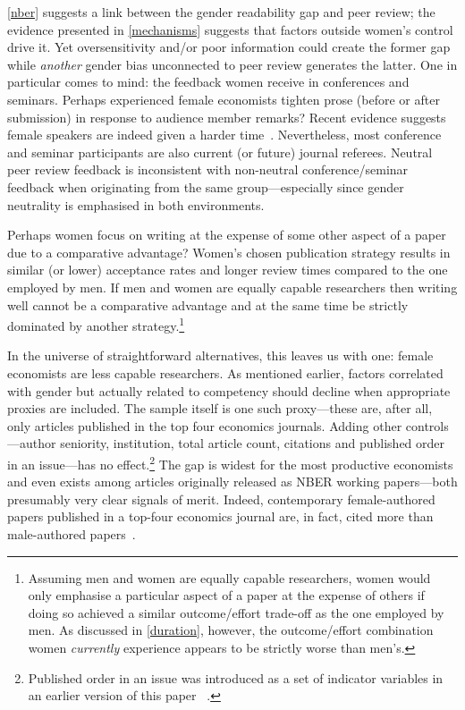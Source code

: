 \begin{appendices}
\begin{refsection}
\autoref{nber} suggests a link between the gender readability gap and peer review; the evidence presented in \autoref{mechanisms} suggests that factors outside women's control drive it. Yet oversensitivity and\slash or poor information could create the former gap while \emph{another} gender bias unconnected to peer review generates the latter. One in particular comes to mind: the feedback women receive in conferences and seminars. Perhaps experienced female economists tighten prose (before or after submission) in response to audience member remarks? Recent evidence suggests female speakers are indeed given a harder time~\citep{Dupas2021}. Nevertheless, most conference and seminar participants are also current (or future) journal referees. Neutral peer review feedback is inconsistent with non-neutral conference\slash seminar feedback when originating from the same group---especially since gender neutrality is emphasised in both environments.

Perhaps women focus on writing at the expense of some other aspect of a paper due to a comparative advantage? Women's chosen publication strategy results in similar (or lower) acceptance rates and longer review times compared to the one employed by men. If men and women are equally capable researchers then writing well cannot be a comparative advantage and at the same time be strictly dominated by another strategy.\footnote{Assuming men and women are equally capable researchers, women would only emphasise a particular aspect of a paper at the expense of others if doing so achieved a similar outcome\slash effort trade-off as the one employed by men. As discussed in \autoref{duration}, however, the outcome\slash effort combination women \emph{currently} experience appears to be strictly worse than men's.}

In the universe of straightforward alternatives, this leaves us with one: female economists are less capable researchers. As mentioned earlier, factors correlated with gender but actually related to competency should decline when appropriate proxies are included. The sample itself is one such proxy---these are, after all, only articles published in the top four economics journals. Adding other controls---author seniority, institution, total article count, citations and published order in an issue---has no effect.\footnote{Published order in an issue was introduced as a set of indicator variables in an earlier version of this paper ~\citep[][pp. 42 and 44]{Hengel2016}.} The gap is widest for the most productive economists and even exists among articles originally released as NBER working papers---both presumably very clear signals of merit. Indeed, contemporary female-authored papers published in a top-four economics journal are, in fact, cited more than male-authored papers~\citep{Moon2020}.


\end{refsection}
\end{appendices}
